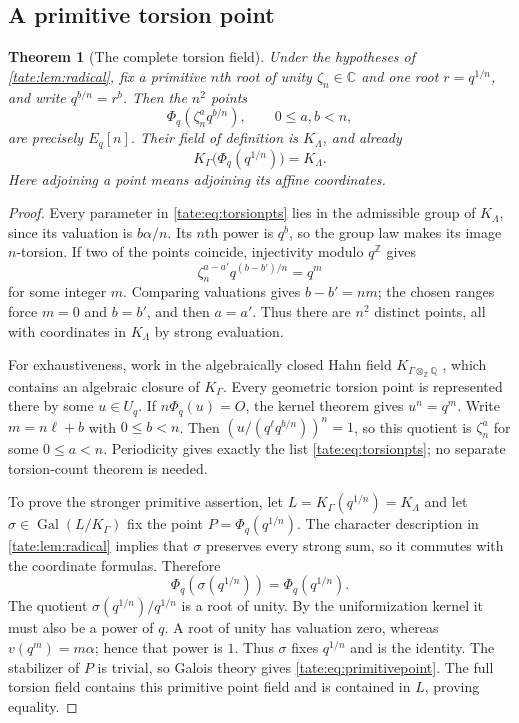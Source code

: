 \documentclass[11pt,letterpaper]{article}
\newtheorem{theorem}{Theorem}[section]
\theoremstyle{definition}
\newcommand{\C}{\mathbb C}
\newcommand{\Q}{\mathbb Q}
\newcommand{\Z}{\mathbb Z}
\newcommand{\Gal}{\operatorname{Gal}}
\begin{document}
\subsection{A primitive torsion point}

\begin{theorem}[The complete torsion field]\label{tate:thm:torsion}
Under the hypotheses of \cref{tate:lem:radical}, fix a primitive $n$th
root of unity $\zeta_n\in\C$ and one root $r=q^{1/n}$, and write
$q^{b/n}=r^b$. Then the $n^2$ points
\begin{equation}
 \Phi_q(\zeta_n^a q^{b/n}),\qquad 0\le a,b<n,\label{tate:eq:torsionpts}
\end{equation}
are precisely $E_q[n]$. Their field of definition is $K_\Lambda$,
and already
\begin{equation}
 K_\Gamma\bigl(\Phi_q(q^{1/n})\bigr)=K_\Lambda.\label{tate:eq:primitivepoint}
\end{equation}
Here adjoining a point means adjoining its affine coordinates.
\end{theorem}

\begin{proof}
Every parameter in \eqref{tate:eq:torsionpts} lies in the admissible group of
$K_\Lambda$, since its valuation is $b\alpha/n$. Its $n$th power is
$q^b$, so the group law makes its image $n$-torsion. If two of the
points coincide, injectivity modulo $q^\Z$ gives
\[
 \zeta_n^{a-a'}q^{(b-b')/n}=q^m
\]
for some integer $m$. Comparing valuations gives $b-b'=nm$; the chosen
ranges force $m=0$ and $b=b'$, and then $a=a'$. Thus there are $n^2$
distinct points, all with coordinates in $K_\Lambda$ by strong evaluation.

For exhaustiveness, work in the algebraically closed Hahn field
$K_{\Gamma\otimes_\Z\Q}$ \cite[Corollary~4]{Poonen}, which contains an
algebraic closure of $K_\Gamma$. Every geometric torsion point is
represented there by some $u\in U_q$. If $n\Phi_q(u)=O$, the kernel
theorem gives $u^n=q^m$. Write $m=n\ell+b$ with $0\le b<n$.
Then $(u/(q^\ell q^{b/n}))^n=1$, so this quotient is $\zeta_n^a$
for some $0\le a<n$. Periodicity gives exactly the list
\eqref{tate:eq:torsionpts}; no separate torsion-count theorem is needed.

To prove the stronger primitive assertion, let
$L=K_\Gamma(q^{1/n})=K_\Lambda$ and let $\sigma\in\Gal(L/K_\Gamma)$
fix the point $P=\Phi_q(q^{1/n})$. The character description in
\cref{tate:lem:radical} implies that $\sigma$ preserves every strong sum,
so it commutes with the coordinate formulas. Therefore
\[
 \Phi_q(\sigma(q^{1/n}))=\Phi_q(q^{1/n}).
\]
The quotient $\sigma(q^{1/n})/q^{1/n}$ is a root of unity. By the
uniformization kernel it must also be a power of $q$. A root of unity
has valuation zero, whereas $v(q^m)=m\alpha$; hence that power is $1$.
Thus $\sigma$ fixes $q^{1/n}$ and is the identity. The stabilizer of
$P$ is trivial, so Galois theory gives \eqref{tate:eq:primitivepoint}.
The full torsion field contains this primitive point field and is
contained in $L$, proving equality.
\end{proof}
\end{document}
